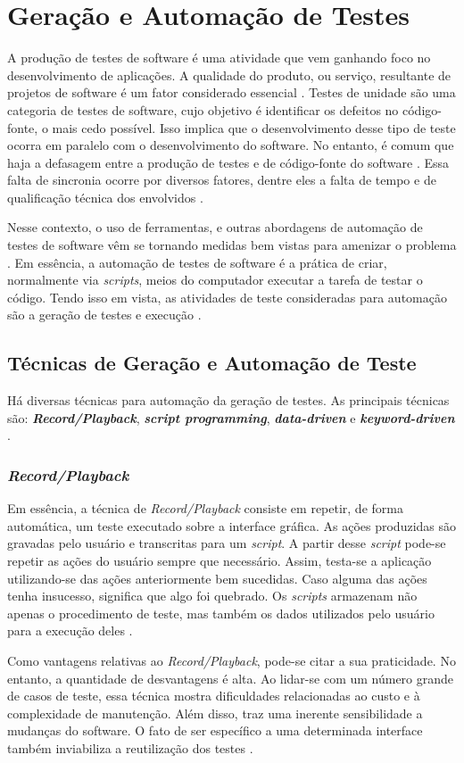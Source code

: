 \section{Geração e Automação de Testes}
A produção de testes de software é uma atividade que vem ganhando foco no desenvolvimento de aplicações. A qualidade do produto, ou serviço, resultante de projetos de software é um fator considerado essencial \cite{barbosaEtAl2009}. Testes de unidade são uma categoria de testes de software, cujo objetivo é identificar os defeitos no código-fonte, o mais cedo possível. Isso implica que o desenvolvimento desse tipo de teste ocorra em paralelo com o desenvolvimento do software. No entanto, é comum que haja a defasagem entre a produção de testes e de código-fonte do software \cite{fantinatoEtAl2004}. Essa falta de sincronia ocorre por diversos fatores, dentre eles a falta de tempo e de qualificação técnica dos envolvidos \cite{fantinatoEtAl2004}.
\par
\indent Nesse contexto, o uso de ferramentas, e outras abordagens de automação de testes de software vêm se tornando medidas bem vistas para amenizar o problema \cite{fantinatoEtAl2004}. Em essência, a automação de testes de software é a prática de criar, normalmente via \textit{scripts}, meios do computador executar a tarefa de testar o código. Tendo isso em vista, as atividades de teste consideradas para automação são a geração de testes e execução \cite{fantinatoEtAl2004}.

\subsection{Técnicas de Geração e Automação de Teste}
Há diversas técnicas para automação da geração de testes. As principais técnicas são: \textbf{\textit{Record/Playback}}, \textbf{\textit{script programming}}, \textbf{\textit{data-driven}} e \textbf{\textit{keyword-driven}} \cite{fantinatoEtAl2004}.
\subsubsection{\textit{Record/Playback}}
Em essência, a técnica de \textit{Record/Playback} consiste em repetir, de forma automática, um teste executado sobre a interface gráfica. As ações produzidas são gravadas pelo usuário e transcritas para um \textit{script}. A partir desse \textit{script} pode-se repetir as ações do usuário sempre que necessário. Assim, testa-se a aplicação utilizando-se das ações anteriormente bem sucedidas. Caso alguma das ações tenha insucesso, significa que algo foi quebrado. Os \textit{scripts} armazenam não apenas o procedimento de teste, mas também os dados utilizados pelo usuário para a execução deles \cite{kent2007}.
\par
\indent Como vantagens relativas ao \textit{Record/Playback}, pode-se citar a sua praticidade. No entanto, a quantidade de desvantagens é alta. Ao lidar-se com um número grande de casos de teste, essa técnica mostra dificuldades relacionadas ao custo e à complexidade de manutenção. Além disso, traz uma inerente sensibilidade a mudanças do software. O fato de ser específico a uma determinada interface também inviabiliza a reutilização dos testes \cite{fantinatoEtAl2004}.
